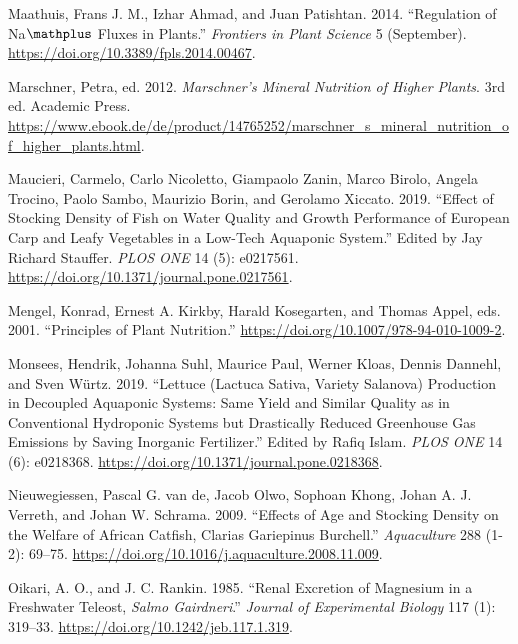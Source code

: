 \documentclass[
]{article}
\newlength{\cslhangindent}
\newlength{\cslentryspacingunit} %
\newenvironment{CSLReferences}[2] %
 {%
  \setlength{\parindent}{0pt}
  \ifodd #1
  \let\oldpar\par
  \def\par{\hangindent=\cslhangindent\oldpar}
  \fi
  \setlength{\parskip}{#2\cslentryspacingunit}
 }%
 {}
\begin{document}
\begin{CSLReferences}{1}{0}
\leavevmode{}%
Maathuis, Frans J. M., Izhar Ahmad, and Juan Patishtan. 2014. {``Regulation of Na\(\mathplus\) Fluxes in Plants.''} \emph{Frontiers in Plant Science} 5 (September). \url{https://doi.org/10.3389/fpls.2014.00467}.

\leavevmode{}%
Marschner, Petra, ed. 2012. \emph{Marschner's Mineral Nutrition of Higher Plants}. 3rd ed. Academic Press. \url{https://www.ebook.de/de/product/14765252/marschner_s_mineral_nutrition_of_higher_plants.html}.

\leavevmode{}%
Maucieri, Carmelo, Carlo Nicoletto, Giampaolo Zanin, Marco Birolo, Angela Trocino, Paolo Sambo, Maurizio Borin, and Gerolamo Xiccato. 2019. {``Effect of Stocking Density of Fish on Water Quality and Growth Performance of European Carp and Leafy Vegetables in a Low-Tech Aquaponic System.''} Edited by Jay Richard Stauffer. \emph{{PLOS} {ONE}} 14 (5): e0217561. \url{https://doi.org/10.1371/journal.pone.0217561}.

\leavevmode{}%
Mengel, Konrad, Ernest A. Kirkby, Harald Kosegarten, and Thomas Appel, eds. 2001. {``Principles of Plant Nutrition.''} \url{https://doi.org/10.1007/978-94-010-1009-2}.

\leavevmode{}%
Monsees, Hendrik, Johanna Suhl, Maurice Paul, Werner Kloas, Dennis Dannehl, and Sven Würtz. 2019. {``Lettuce (Lactuca Sativa, Variety Salanova) Production in Decoupled Aquaponic Systems: Same Yield and Similar Quality as in Conventional Hydroponic Systems but Drastically Reduced Greenhouse Gas Emissions by Saving Inorganic Fertilizer.''} Edited by Rafiq Islam. \emph{{PLOS} {ONE}} 14 (6): e0218368. \url{https://doi.org/10.1371/journal.pone.0218368}.

\leavevmode{}%
Nieuwegiessen, Pascal G. van de, Jacob Olwo, Sophoan Khong, Johan A. J. Verreth, and Johan W. Schrama. 2009. {``Effects of Age and Stocking Density on the Welfare of African Catfish, Clarias Gariepinus Burchell.''} \emph{Aquaculture} 288 (1-2): 69--75. \url{https://doi.org/10.1016/j.aquaculture.2008.11.009}.

\leavevmode{}%
Oikari, A. O., and J. C. Rankin. 1985. {``Renal Excretion of Magnesium in a Freshwater Teleost, \emph{Salmo Gairdneri}.''} \emph{Journal of Experimental Biology} 117 (1): 319--33. \url{https://doi.org/10.1242/jeb.117.1.319}.


\end{CSLReferences}
\end{document}
